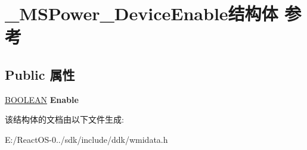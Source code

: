 \hypertarget{struct___m_s_power___device_enable}{}\section{\+\_\+\+M\+S\+Power\+\_\+\+Device\+Enable结构体 参考}
\label{struct___m_s_power___device_enable}
\subsection*{Public 属性}
\begin{DoxyCompactItemize}
\item 
\mbox{\label{struct___m_s_power___device_enable_a6dd2c374576c678cb6049199e39c7130}} 
\hyperlink{_processor_bind_8h_a112e3146cb38b6ee95e64d85842e380a}{B\+O\+O\+L\+E\+AN} {\bfseries Enable}
\end{DoxyCompactItemize}


该结构体的文档由以下文件生成\+:\begin{DoxyCompactItemize}
\item 
E\+:/\+React\+O\+S-\/0../sdk/include/ddk/wmidata.\+h\end{DoxyCompactItemize}
